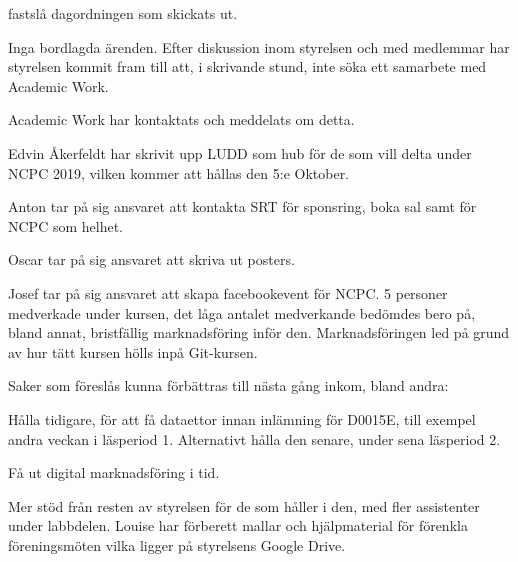 \documentclass{protokoll}
\begin{document}
\newpage  


\begin{beslut}
     \att fastslå dagordningen som skickats ut.
\end{beslut}

Inga bordlagda ärenden.
Efter diskussion inom styrelsen och med medlemmar har styrelsen kommit fram
till att, i skrivande stund, inte söka ett samarbete med Academic Work. 


Academic Work har kontaktats och meddelats om detta.

Edvin Åkerfeldt har skrivit upp LUDD som hub för de som vill delta under NCPC 
2019, vilken kommer att hållas den 5:e Oktober. 


Anton tar på sig ansvaret att kontakta SRT för sponsring, boka sal samt för 
NCPC som helhet.


Oscar tar på sig ansvaret att skriva ut posters. 

Josef tar på sig ansvaret att skapa facebookevent för NCPC.
5 personer medverkade under kursen, det låga antalet medverkande bedömdes bero
  på, bland annat, bristfällig marknadsföring inför den.
Marknadsföringen led på grund av hur tätt kursen hölls inpå Git-kursen.


Saker som föreslås kunna förbättras till nästa gång inkom, bland andra: 


Hålla tidigare, för att få dataettor innan inlämning för D0015E, till exempel 
andra veckan i läsperiod 1. Alternativt hålla den senare, under sena läsperiod
2.  


Få ut digital marknadsföring i tid. 


Mer stöd från resten av styrelsen för de som håller i den, med fler assistenter
under labbdelen. 
Louise har förberett mallar och hjälpmaterial för förenkla föreningsmöten vilka 
ligger på styrelsens Google Drive. 
\end{document}
